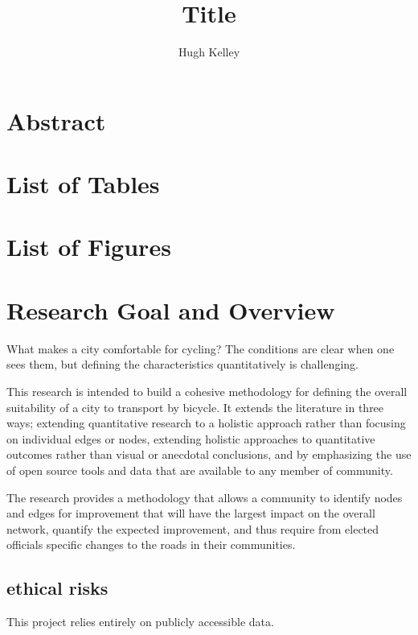 \documentclass[11pt]{article} %
\title{\vspace{-3.0cm}Title}
\author{Hugh Kelley}
\date{} %
\begin{document}
\maketitle

\section{Abstract}

\section{List of Tables}

\section{List of Figures}


\section{Research Goal and Overview}
What makes a city comfortable for cycling? The conditions are clear when one sees them, but defining the characteristics quantitatively is challenging. 

This research is intended to build a cohesive methodology for defining the overall suitability of a city to transport by bicycle. It extends the literature in three ways; extending quantitative research to a holistic approach rather than focusing on individual edges or nodes, extending holistic approaches to quantitative outcomes rather than visual or anecdotal conclusions, and by emphasizing the use of open source tools and data that are available to any member of community. 

The research provides a methodology that allows a community to identify nodes and edges for improvement that will have the largest impact on the overall network, quantify the expected improvement, and thus require from elected officials specific changes to the roads in their communities. 

\subsection{ethical risks}

This project relies entirely on publicly accessible data. 
\end{document}
